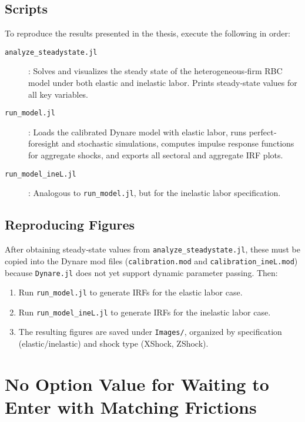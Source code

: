 \documentclass[a4paper,12pt]{article} %
\numberwithin{equation}{section} %
\numberwithin{figure}{section}
\numberwithin{table}{section}
\begin{document}
\begin{refsection}
\begin{appendices}
\subsection{Scripts}

To reproduce the results presented in the thesis, execute the following in order:

\begin{description}
  \item[\texttt{analyze\_steadystate.jl}]: 
    Solves and visualizes the steady state of the heterogeneous‐firm RBC model under both elastic and inelastic labor. Prints steady‐state values for all key variables.
  \item[\texttt{run\_model.jl}]: 
    Loads the calibrated Dynare model with elastic labor, runs perfect‐foresight and stochastic simulations, computes impulse response functions for aggregate shocks, and exports all sectoral and aggregate IRF plots.
  \item[\texttt{run\_model\_ineL.jl}]: 
    Analogous to \texttt{run\_model.jl}, but for the inelastic labor specification.
\end{description}

\subsection{Reproducing Figures}

After obtaining steady‐state values from \texttt{analyze\_steadystate.jl}, these must be copied into the Dynare mod files (\texttt{calibration.mod} and \texttt{calibration\_ineL.mod}) because \texttt{Dynare.jl} does not yet support dynamic parameter passing. Then:

\begin{enumerate}
  \item Run \texttt{run\_model.jl} to generate IRFs for the elastic labor case.
  \item Run \texttt{run\_model\_ineL.jl} to generate IRFs for the inelastic labor case.
  \item The resulting figures are saved under \texttt{Images/}, organized by specification 
  (elastic/inelastic) and shock type (XShock, ZShock).
\end{enumerate}


\pagebreak
\section{No Option Value for Waiting to Enter with Matching Frictions}
\label{sec-app:option}


\end{appendices}
\end{refsection}
\end{document}

